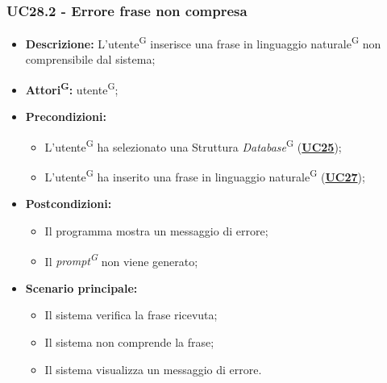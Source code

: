\subsubsection{UC28.2 - Errore frase non compresa}
\label{sec:UC28.2}
\begin{itemize}
	\item \textbf{Descrizione:} L’utente\textsuperscript{G} inserisce una frase in linguaggio naturale\textsuperscript{G} non comprensibile dal sistema;
	\item \textbf{Attori\textsuperscript{G}:} utente\textsuperscript{G};
	\item \textbf{Precondizioni:} 
	\begin{itemize}
			\item L’utente\textsuperscript{G} ha selezionato una Struttura \textit{Database}\textsuperscript{G} (\hyperref[sec:UC25]{\textbf{UC25}});
		\item L'utente\textsuperscript{G} ha inserito una frase in linguaggio naturale\textsuperscript{G} (\hyperref[sec:UC27]{\textbf{UC27}});
	\end{itemize}
	\item \textbf{Postcondizioni:} 
	\begin{itemize}
		\item Il programma mostra un messaggio di errore;
		\item Il \textit{prompt\textsuperscript{G}} non viene generato;
	\end{itemize}
	\item \textbf{Scenario principale:} 
	\begin{itemize}
		\item Il sistema verifica la frase ricevuta;
		\item Il sistema non comprende la frase;
		\item Il sistema visualizza un messaggio di errore.
	\end{itemize}
\end{itemize}


